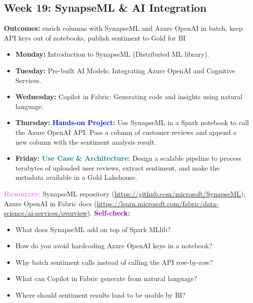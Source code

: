 \documentclass[11pt, a4paper]{article}
\newcommand{\project}[1]{\vspace{1mm}\noindent\textbf{\textcolor{blue}{Hands-on Project:}} #1}
\newcommand{\usecase}[1]{\vspace{1mm}\noindent\textbf{\textcolor{teal}{Use Case \& Architecture:}} #1}
\newcommand{\dayitem}[2]{\item \textbf{#1:} #2}
\newcommand{\resources}[1]{\vspace{1mm}\noindent\textbf{\textcolor{violet}{Resources:}} #1}
\newcommand{\selfcheck}[1]{\vspace{1mm}\noindent\textbf{\textcolor{purple}{Self-check:}} #1}
\begin{document}
\subsection*{Week 19: SynapseML \& AI Integration}
\par\noindent\textbf{Outcomes:} enrich columns with SynapseML and Azure OpenAI in batch, keep API keys out of notebooks, publish sentiment to Gold for BI
\begin{itemize}[label=-]
    \dayitem{Monday}{Introduction to SynapseML (Distributed ML library).}
    \dayitem{Tuesday}{Pre-built AI Models: Integrating Azure OpenAI and Cognitive Services.}
    \dayitem{Wednesday}{Copilot in Fabric: Generating code and insights using natural language.}
    \dayitem{Thursday}{\project{Use SynapseML in a Spark notebook to call the Azure OpenAI API. Pass a column of customer reviews and append a new column with the sentiment analysis result.}}
    \dayitem{Friday}{\usecase{Design a scalable pipeline to process terabytes of uploaded user reviews, extract sentiment, and make the metadata available in a Gold Lakehouse.}}
\end{itemize}
\resources{SynapseML repository (\url{https://github.com/microsoft/SynapseML}); Azure OpenAI in Fabric docs (\url{https://learn.microsoft.com/fabric/data-science/ai-services/overview}).}
\selfcheck{
\begin{itemize}[label=$\bullet$, leftmargin=6mm, itemsep=0pt]
    \item What does SynapseML add on top of Spark MLlib?
    \item How do you avoid hardcoding Azure OpenAI keys in a notebook?
    \item Why batch sentiment calls instead of calling the API row-by-row?
    \item What can Copilot in Fabric generate from natural language?
    \item Where should sentiment results land to be usable by BI?
\end{itemize}
}
\end{document}
